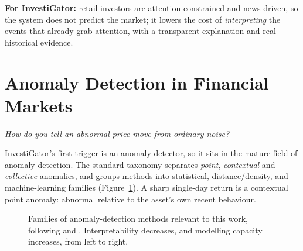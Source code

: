 \textbf{For InvestiGator:} retail investors are attention-constrained and news-driven, so the system does not
predict the market; it lowers the cost of \emph{interpreting} the events that already grab attention, with
a transparent explanation and real historical evidence.

\section{Anomaly Detection in Financial Markets}
\label{sec:sota_anomaly}

\emph{How do you tell an abnormal price move from ordinary noise?}

InvestiGator's first trigger is an anomaly detector, so it sits in the mature field of anomaly detection. The
standard taxonomy \autocite{chandola2009anomaly} separates \emph{point}, \emph{contextual} and
\emph{collective} anomalies, and groups methods into statistical, distance/density, and machine-learning
families (Figure~\ref{fig:sota_anomaly_taxonomy}). A sharp single-day return is a contextual point
anomaly: abnormal relative to the asset's own recent behaviour.

\begin{figure}[ht]
\centering
{}
\caption[Taxonomy of anomaly-detection methods]{Families of anomaly-detection methods relevant to this
work, following \textcite{chandola2009anomaly} and \textcite{pang2021deep}. Interpretability decreases,
and modelling capacity increases, from left to right.}
\label{fig:sota_anomaly_taxonomy}
\end{figure}

